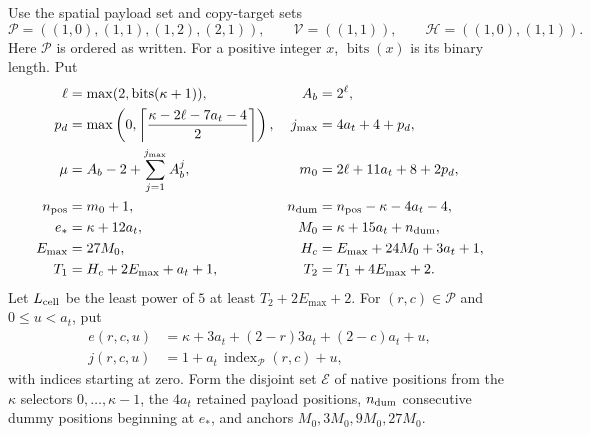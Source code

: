 \documentclass[11pt,a4paper]{article}
\theoremstyle{remark}\newtheorem{remark}[theorem]{Remark}
\newcommand{\bits}{\operatorname{bits}}
\begin{document}
Use the spatial payload set and copy-target sets
\[
 \mathcal P=((1,0),(1,1),(1,2),(2,1)),\qquad
 \mathcal V=((1,1)),\qquad
 \mathcal H=((1,0),(1,1)).
\]
Here $\mathcal P$ is ordered as written. For a positive integer $x$,
$\bits(x)$ is its binary length. Put
\begin{align*}
 \ell&=\max(2,\bits(\kappa+1)),& A_b&=2^\ell,\\
 p_d&=\max\left(0,\left\lceil
            \frac{\kappa-2\ell-7a_t-4}{2}\right\rceil\right),&
 j_{\max}&=4a_t+4+p_d,\\
 \mu&=A_b-2+\sum_{j=1}^{j_{\max}}A_b^j,&
 m_0&=2\ell+11a_t+8+2p_d,\\
 n_{\rm pos}&=m_0+1,&
 n_{\rm dum}&=n_{\rm pos}-\kappa-4a_t-4,\\
 e_*&=\kappa+12a_t,&
 M_0&=\kappa+15a_t+n_{\rm dum},\\
 E_{\max}&=27M_0,&
 H_c&=E_{\max}+24M_0+3a_t+1,\\
 T_1&=H_c+2E_{\max}+a_t+1,&
 T_2&=T_1+4E_{\max}+2.
\end{align*}
Let $L_{\rm cell}$ be the least power of $5$ at least
$T_2+2E_{\max}+2$. For $(r,c)\in\mathcal P$ and $0\le u<a_t$, put
\begin{align*}
 e(r,c,u)&=\kappa+3a_t+(2-r)3a_t+(2-c)a_t+u,\\
 j(r,c,u)&=1+a_t\,\operatorname{index}_{\mathcal P}(r,c)+u,
\end{align*}
with indices starting at zero. Form the disjoint set $\mathcal E$
of native positions from the $\kappa$ selectors $0,\ldots,\kappa-1$,
the $4a_t$ retained payload positions, $n_{\rm dum}$ consecutive
dummy positions beginning at $e_*$, and anchors
$M_0,3M_0,9M_0,27M_0$.
\end{document}
